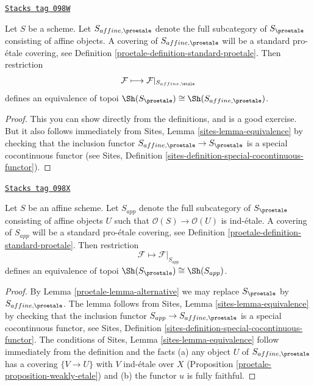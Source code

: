 \begin{lemma}[Alternative]
\label{proetale-lemma-alternative}
\href{https://stacks.math.columbia.edu/tag/098W}{\texttt{Stacks tag 098W}}

Let $S$ be a scheme. Let $S_{affine, \proetale}$ denote the full subcategory
of $S_\proetale$ consisting of affine objects. A covering of
$S_{affine, \proetale}$ will be a standard pro-\'etale covering, see
Definition \ref{proetale-definition-standard-proetale}.
Then restriction
$$
\mathcal{F} \longmapsto \mathcal{F}|_{S_{affine, \etale}}
$$
defines an equivalence of topoi
$\Sh(S_\proetale) \cong \Sh(S_{affine, \proetale})$.
\end{lemma}

\begin{proof}
This you can show directly from the definitions, and is a good exercise.
But it also follows immediately from
Sites, Lemma \ref{sites-lemma-equivalence}
by checking that the inclusion functor
$S_{affine, \proetale} \to S_\proetale$
is a special cocontinuous functor (see
Sites, Definition \ref{sites-definition-special-cocontinuous-functor}).
\end{proof}

\begin{lemma}
\label{proetale-lemma-affine-alternative}
\href{https://stacks.math.columbia.edu/tag/098X}{\texttt{Stacks tag 098X}}

Let $S$ be an affine scheme. Let $S_{app}$ denote the full subcategory
of $S_\proetale$ consisting of affine objects $U$ such that
$\mathcal{O}(S) \to \mathcal{O}(U)$ is ind-\'etale. A covering of
$S_{app}$ will be a standard pro-\'etale covering, see
Definition \ref{proetale-definition-standard-proetale}.
Then restriction
$$
\mathcal{F} \longmapsto \mathcal{F}|_{S_{app}}
$$
defines an equivalence of topoi $\Sh(S_\proetale) \cong \Sh(S_{app})$.
\end{lemma}

\begin{proof}

By Lemma \ref{proetale-lemma-alternative} we may replace $S_\proetale$ by
$S_{affine, \proetale}$.
The lemma follows from Sites, Lemma \ref{sites-lemma-equivalence}
by checking that the inclusion functor $S_{app} \to S_{affine, \proetale}$
is a special cocontinuous functor, see
Sites, Definition \ref{sites-definition-special-cocontinuous-functor}.
The conditions of Sites, Lemma \ref{sites-lemma-equivalence}
follow immediately from the definition and the facts
(a) any object $U$ of $S_{affine, \proetale}$ has a covering
$\{V \to U\}$ with $V$ ind-\'etale over $X$
(Proposition \ref{proetale-proposition-weakly-etale})
and (b) the functor $u$ is fully faithful.
\end{proof}


